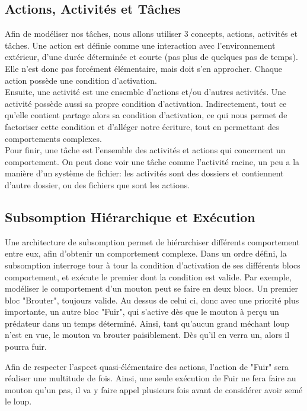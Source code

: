 \documentclass[11pt,a4paper]{report}
\begin{document}
		\subsection{Actions, Activités et Tâches}
			Afin de modéliser nos tâches, nous allons utiliser 3 concepts, actions, activités et tâches. Une action est définie comme une interaction avec l'environnement extérieur, d'une durée déterminée et courte (pas plus de quelques pas de temps). Elle n'est donc pas forcément élémentaire, mais doit s'en approcher. Chaque action possède une condition d'activation.\\
			Ensuite, une activité est une ensemble d'actions et/ou d'autres activités. Une activité possède aussi sa propre condition d'activation. Indirectement, tout ce qu'elle contient partage alors sa condition d'activation, ce qui nous permet de factoriser cette condition et d'alléger notre écriture, tout en permettant des comportements complexes.\\
			Pour finir, une tâche est l'ensemble des activités et actions qui concernent un comportement. On peut donc voir une tâche comme l'activité racine, un peu a la manière d'un système de fichier: les activités sont des dossiers et contiennent d'autre dossier, ou des fichiers que sont les actions.
		\subsection{Subsomption Hiérarchique et Exécution}
		
			Une architecture de subsomption permet de hiérarchiser différents comportement entre eux, afin d'obtenir un comportement complexe. Dans un ordre défini, la subsomption interroge tour à tour la condition d'activation de ses différents blocs comportement, et exécute le premier dont la condition est valide. Par exemple, modéliser le comportement d'un mouton peut se faire en deux blocs. Un premier bloc "Brouter", toujours valide. Au dessus de celui ci, donc avec une priorité plus importante, un autre bloc "Fuir", qui s'active dès que le mouton à perçu un prédateur dans un temps déterminé. Ainsi, tant qu'aucun grand méchant loup n'est en vue, le mouton va brouter paisiblement. Dès qu'il en verra un, alors il pourra fuir.
			
			Afin de respecter l'aspect quasi-élémentaire des actions, l'action de "Fuir" sera réaliser une multitude de fois. Ainsi, une seule exécution de Fuir ne fera faire au mouton qu'un pas, il va y faire appel plusieurs fois avant de considérer avoir semé le loup.
			
\end{document}
